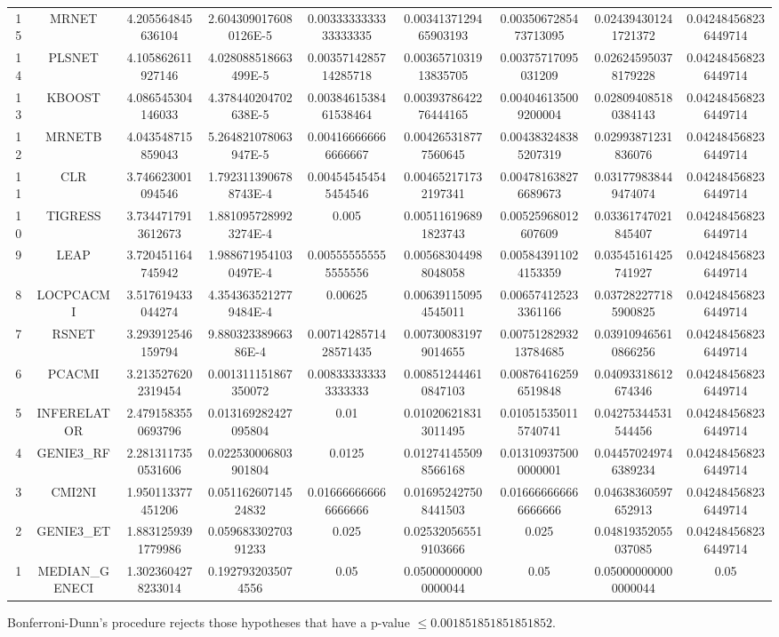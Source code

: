 \documentclass[a4paper,10pt]{article}
\begin{document}
\begin{landscape}
\begin{table}[!htp]
\begin{tabular}{ccccccccc}
15&MRNET&4.205564845636104&2.6043090176080126E-5&0.0033333333333333335&0.0034137129465903193&0.0035067285473713095&0.024394301241721372&0.042484568236449714\\
14&PLSNET&4.105862611927146&4.028088518663499E-5&0.0035714285714285718&0.0036571031913835705&0.00375717095031209&0.026245950378179228&0.042484568236449714\\
13&KBOOST&4.086545304146033&4.378440204702638E-5&0.0038461538461538464&0.0039378642276444165&0.004046135009200004&0.028094085180384143&0.042484568236449714\\
12&MRNETB&4.043548715859043&5.264821078063947E-5&0.004166666666666667&0.004265318777560645&0.004383248385207319&0.02993871231836076&0.042484568236449714\\
11&CLR&3.746623001094546&1.7923113906788743E-4&0.004545454545454546&0.004652171732197341&0.004781638276689673&0.031779838449474074&0.042484568236449714\\
10&TIGRESS&3.7344717913612673&1.8810957289923274E-4&0.005&0.005116196891823743&0.00525968012607609&0.03361747021845407&0.042484568236449714\\
9&LEAP&3.720451164745942&1.9886719541030497E-4&0.005555555555555556&0.005683044988048058&0.005843911024153359&0.03545161425741927&0.042484568236449714\\
8&LOCPCACMI&3.517619433044274&4.3543635212779484E-4&0.00625&0.006391150954545011&0.006574125233361166&0.037282277185900825&0.042484568236449714\\
7&RSNET&3.293912546159794&9.88032338966386E-4&0.0071428571428571435&0.007300831979014655&0.0075128293213784685&0.039109465610866256&0.042484568236449714\\
6&PCACMI&3.2135276202319454&0.001311151867350072&0.008333333333333333&0.008512444610847103&0.008764162596519848&0.04093318612674346&0.042484568236449714\\
5&INFERELATOR&2.4791583550693796&0.013169282427095804&0.01&0.010206218313011495&0.010515350115740741&0.04275344531544456&0.042484568236449714\\
4&GENIE3_RF&2.2813117350531606&0.022530006803901804&0.0125&0.012741455098566168&0.013109375000000001&0.044570249746389234&0.042484568236449714\\
3&CMI2NI&1.950113377451206&0.05116260714524832&0.016666666666666666&0.016952427508441503&0.016666666666666666&0.04638360597652913&0.042484568236449714\\
2&GENIE3_ET&1.8831259391779986&0.05968330270391233&0.025&0.025320565519103666&0.025&0.04819352055037085&0.042484568236449714\\
1&MEDIAN_GENECI&1.3023604278233014&0.1927932035074556&0.05&0.050000000000000044&0.05&0.050000000000000044&0.05\\
\hline
\end{tabular}
\end{table}
Bonferroni-Dunn's procedure rejects those hypotheses that have a p-value $\le0.001851851851851852$.



\end{landscape}
\end{document}
